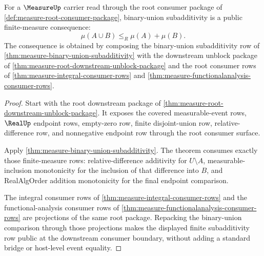 \begin{theorem}
\label{thm:measure-root-subadditivity-consumer-boundary}
For a $\MeasureUp$ carrier read through the root consumer package of
\autoref{def:measure-root-consumer-package}, binary-union subadditivity is a
public finite-measure consequence:
$$
\mu(A\cup B)\le_R\mu(A)+\mu(B).
$$
The consequence is obtained by composing the binary-union subadditivity row of
\autoref{thm:measure-binary-union-subadditivity} with the downstream unblock
package of \autoref{thm:measure-root-downstream-unblock-package} and the root
consumer rows of \autoref{thm:measure-integral-consumer-rows} and
\autoref{thm:measure-functionalanalysis-consumer-rows}.
\end{theorem}
\begin{proof}
Start with the root downstream package of
\autoref{thm:measure-root-downstream-unblock-package}. It exposes the covered
measurable-event rows, $\RealUp$ endpoint rows, empty-zero row, finite
disjoint-union row, relative-difference row, and nonnegative endpoint row
through the root consumer surface.

Apply \autoref{thm:measure-binary-union-subadditivity}. The theorem consumes
exactly those finite-measure rows: relative-difference additivity for
$U\setminus A$, measurable-inclusion monotonicity for the inclusion of that
difference into $B$, and RealAlgOrder addition monotonicity for the final
endpoint comparison.

The integral consumer rows of \autoref{thm:measure-integral-consumer-rows} and
the functional-analysis consumer rows of
\autoref{thm:measure-functionalanalysis-consumer-rows} are projections of the
same root package. Repacking the binary-union comparison through those
projections makes the displayed finite subadditivity row public at the
downstream consumer boundary, without adding a standard bridge or host-level
event equality.
\end{proof}
